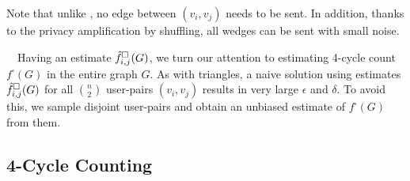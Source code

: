 Note that unlike \AlgWSLE{}, no edge between $(v_i,v_j)$ needs to be sent. 
In addition, thanks to the privacy amplification by shuffling, all wedges can be sent with 
small noise.

\smallskip
~~Having an estimate $\hat{f}_{i,j}^\square(G)$, we turn our attention to estimating 4-cycle count $f^\square(G)$ in the entire graph $G$.
As with triangles, a naive solution using estimates $\hat{f}_{i,j}^\square(G)$ for all $\binom{n}{2}$ user-pairs $(v_i,v_j)$ results in very large $\epsilon$ and $\delta$. 
To avoid this, we sample disjoint user-pairs and obtain an unbiased estimate of $f^\square(G)$ from them. 

\subsection{4-Cycle Counting}
\label{chap3-sub:4cycle_details}

